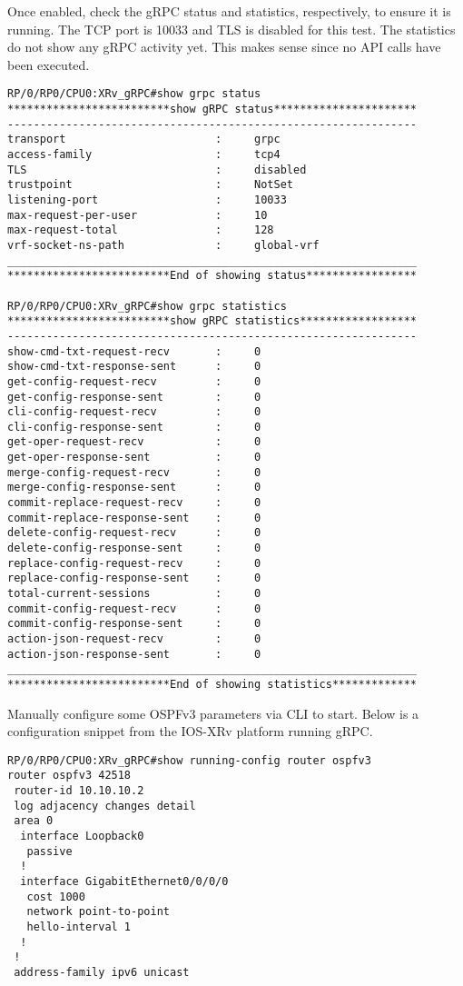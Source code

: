 Once enabled, check the gRPC status and statistics, respectively, to ensure it
is running. The TCP port is 10033 and TLS is disabled for this test. The
statistics do not show any gRPC activity yet. This makes sense since no API
calls have been executed.

\begin{verbatim}
RP/0/RP0/CPU0:XRv_gRPC#show grpc status
*************************show gRPC status**********************
---------------------------------------------------------------
transport                       :     grpc
access-family                   :     tcp4
TLS                             :     disabled
trustpoint                      :     NotSet
listening-port                  :     10033
max-request-per-user            :     10
max-request-total               :     128
vrf-socket-ns-path              :     global-vrf
_______________________________________________________________
*************************End of showing status*****************

RP/0/RP0/CPU0:XRv_gRPC#show grpc statistics 
*************************show gRPC statistics******************
---------------------------------------------------------------
show-cmd-txt-request-recv       :     0
show-cmd-txt-response-sent      :     0
get-config-request-recv         :     0
get-config-response-sent        :     0
cli-config-request-recv         :     0
cli-config-response-sent        :     0
get-oper-request-recv           :     0
get-oper-response-sent          :     0
merge-config-request-recv       :     0
merge-config-response-sent      :     0
commit-replace-request-recv     :     0
commit-replace-response-sent    :     0
delete-config-request-recv      :     0
delete-config-response-sent     :     0
replace-config-request-recv     :     0
replace-config-response-sent    :     0
total-current-sessions          :     0
commit-config-request-recv      :     0
commit-config-response-sent     :     0
action-json-request-recv        :     0
action-json-response-sent       :     0
_______________________________________________________________
*************************End of showing statistics*************
\end{verbatim}

Manually configure some OSPFv3 parameters via CLI to start. Below is a
configuration snippet from the IOS-XRv platform running gRPC.

\begin{verbatim}
RP/0/RP0/CPU0:XRv_gRPC#show running-config router ospfv3
router ospfv3 42518
 router-id 10.10.10.2
 log adjacency changes detail
 area 0
  interface Loopback0
   passive
  !
  interface GigabitEthernet0/0/0/0
   cost 1000
   network point-to-point
   hello-interval 1
  !
 !
 address-family ipv6 unicast
\end{verbatim}

